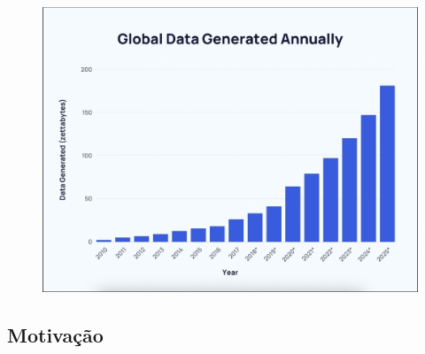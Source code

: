 \documentclass[a4paper, 12pt]{article}
\newcommand{\citeb}[1]{\bibleftbracket\cite{#1}\bibrightbracket}
\begin{document}

    \begin{figure}[ht]
        \includegraphics[width=\textwidth,height=0.9\textheight,keepaspectratio]{global-data-generated-annually-fabio-duarte.png}
        \centering
        \centering
        \label{fig:total_dados_anual}
    \end{figure}        

    \subsection{Motivação}

    
\end{document}
